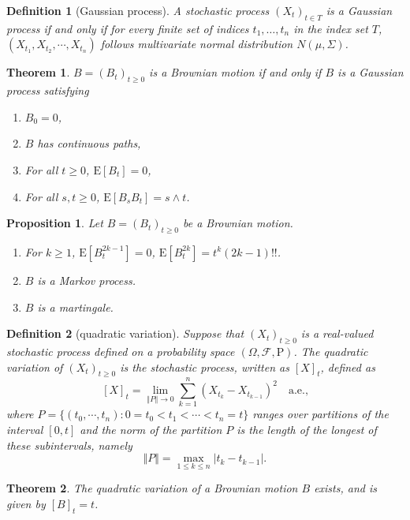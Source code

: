 \documentclass{article}
\newtheorem{definition}{Definition}[section]
\newtheorem{proposition}{Proposition}[section]
\newtheorem{theorem}{Theorem}[section]
\theoremstyle{nonumberplain}
\begin{document}
\begin{definition}[Gaussian process]
A stochastic process $(X_t)_{t\in T}$ is a \emph{Gaussian process} if and only if for every finite set of indices $t_{1},\ldots ,t_{n}$ in the index set $T$, $(X_{t_1},X_{t_2},\cdots,X_{t_n})$ follows multivariate normal distribution $N(\mu,\Sigma)$.
\end{definition}

\begin{theorem}
	$B=(B_t)_{t\ge0}$ is a Brownian motion if and only if $B$ is a Gaussian process satisfying
	\begin{enumerate}
		\item $B_0=0$,
		\item $B$ has continuous paths,
		\item For all $t\ge0$, $\mathrm{E}[B_t]=0$,
		\item For all $s,t\ge0$, $\mathrm{E}[B_sB_t]=s\wedge t$.
	\end{enumerate}
\end{theorem}
\begin{proposition}
	Let $B=(B_t)_{t\ge0}$ be a Brownian motion.
	\begin{enumerate}
	\item For $k\ge1$, $\mathrm{E}[B_t^{2k-1}]=0$, $\mathrm{E}[B_t^{2k}]=t^{k}(2k-1)!!$.
	\item $B$ is a Markov process. 
	\item $B$ is a martingale.
	\end{enumerate}
\end{proposition}
\begin{definition}[quadratic variation]	
Suppose that $(X_t)_{t\ge 0}$ is a real-valued stochastic process defined on a probability space  $(\Omega,\mathcal{F},\mathrm{P})$. The \emph{quadratic} variation of $(X_t)_{t\ge 0}$ is the stochastic process, written as $[X]_t$, defined as
\[
[X]_{t}=\lim_{\Vert P\Vert \rightarrow 0}\sum _{k=1}^{n}(X_{t_{k}}-X_{t_{k-1}})^{2} \quad\text{a.e.,}
\] 
where $P=\{(t_0,\cdots,t_n):0=t_0<t_1<\cdots<t_n=t\}$ ranges over partitions of the interval $[0,t]$ and the norm of the partition $P$ is the length of the longest of these subintervals, namely
\[
\Vert P\Vert=\max\limits_{1\le k\le n}{|t_k-t_{k-1}|}.
\]
\end{definition}
\begin{theorem}
	The quadratic variation of a Brownian motion $B$ exists, and is given by $[B]_t = t$. 
\end{theorem}
\end{document}
